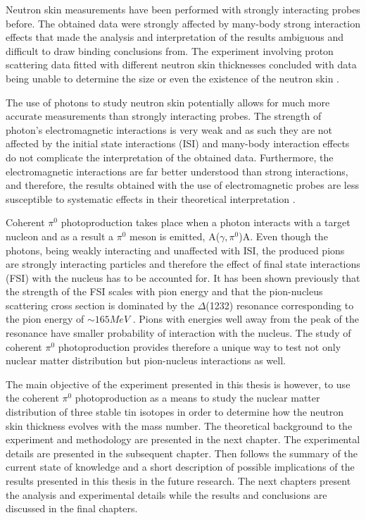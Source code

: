 \indent Neutron skin measurements have been performed with strongly interacting probes before. The obtained data were strongly affected by many-body strong interaction effects that made the analysis and interpretation of the results ambiguous and difficult to draw binding conclusions from. The experiment involving proton scattering data fitted with different neutron skin thicknesses concluded with data being unable to determine the size or even the existence of the neutron skin \cite{pike}.

\indent The use of photons to study neutron skin potentially allows for much more accurate measurements than strongly interacting probes. The strength of photon's electromagnetic interactions is very weak and as such they are not affected by the initial state interactions (ISI) and many-body interaction effects do not complicate the interpretation of the obtained data. Furthermore, the electromagnetic interactions are far better understood than strong interactions, and therefore, the results obtained with the use of electromagnetic probes are less susceptible to systematic effects in their theoretical interpretation \cite{claire}.

\indent Coherent $\pi^{0}$ photoproduction takes place when a photon interacts with a target nucleon and as a result a $\pi^{0}$ meson is emitted, A($\gamma,\pi^{0}$)A. Even though the photons, being weakly interacting and unaffected with ISI, the produced pions are strongly interacting particles and therefore the effect of final state interactions (FSI) with the nucleus has to be accounted for. It has been shown previously that the strength of the FSI scales with pion energy and that the pion-nucleus scattering cross section is dominated by the $\Delta$(1232) resonance corresponding to the pion energy of $\sim165MeV$ . Pions with energies well away from the peak of the resonance have smaller probability of interaction with the nucleus. The study of coherent $\pi^{0}$ photoproduction provides therefore a unique way to test not only nuclear matter distribution but pion-nucleus interactions as well.

\indent The main objective of the experiment presented in this thesis is however, to use the coherent $\pi^{0}$ photoproduction as a means to study the nuclear matter distribution of three stable tin isotopes in order to determine how the neutron skin thickness evolves with the mass number. The theoretical background to the experiment and methodology are presented in the next chapter. The experimental details are presented in the subsequent chapter. Then follows the summary of the current state of knowledge and a short description of possible implications of the results presented in this thesis in the future research. The next chapters present the analysis and experimental details while the results and conclusions are discussed in the final chapters.